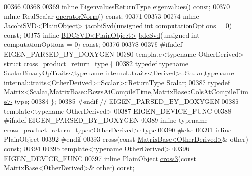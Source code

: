 \begin{DoxyCode}
00366 
00368 
00369     \textcolor{keyword}{inline} EigenvaluesReturnType \hyperlink{group___core___module_a30430fa3d5b4e74d312fd4f502ac984d}{eigenvalues}() \textcolor{keyword}{const};
00370     \textcolor{keyword}{inline} RealScalar \hyperlink{group___core___module_a0ff9bc0b9bea2d0822a2bf3192783102}{operatorNorm}() \textcolor{keyword}{const};
00371 
00373 
00374     \textcolor{keyword}{inline} \hyperlink{group___s_v_d___module_class_eigen_1_1_jacobi_s_v_d}{JacobiSVD<PlainObject>} \hyperlink{group___core___module_a5745dca9c54390633b434e54a1d1eedd}{jacobiSvd}(\textcolor{keywordtype}{unsigned} \textcolor{keywordtype}{int} computationOptions 
      = 0) \textcolor{keyword}{const};
00375     \textcolor{keyword}{inline} \hyperlink{group___s_v_d___module_class_eigen_1_1_b_d_c_s_v_d}{BDCSVD<PlainObject>}    \hyperlink{group___core___module_ae171b74b5d530846ee0836135ffcf837}{bdcSvd}(\textcolor{keywordtype}{unsigned} \textcolor{keywordtype}{int} computationOptions = 0) \textcolor{keyword}{
      const};
00376 
00378 
00379 \textcolor{preprocessor}{    #ifndef EIGEN\_PARSED\_BY\_DOXYGEN}
00380     \textcolor{keyword}{template}<\textcolor{keyword}{typename} OtherDerived> \textcolor{keyword}{struct }cross\_product\_return\_type \{
00382       \textcolor{keyword}{typedef} \textcolor{keyword}{typename} ScalarBinaryOpTraits<typename internal::traits<Derived>::Scalar,\textcolor{keyword}{typename} 
      \hyperlink{struct_eigen_1_1internal_1_1traits}{internal::traits<OtherDerived>::Scalar}>::ReturnType Scalar;
00383       \textcolor{keyword}{typedef} 
      \hyperlink{group___core___module_class_eigen_1_1_matrix}{Matrix<Scalar,MatrixBase::RowsAtCompileTime,MatrixBase::ColsAtCompileTime>}
       type;
00384     \};
00385 \textcolor{preprocessor}{    #endif // EIGEN\_PARSED\_BY\_DOXYGEN}
00386     \textcolor{keyword}{template}<\textcolor{keyword}{typename} OtherDerived>
00387     EIGEN\_DEVICE\_FUNC
00388 \textcolor{preprocessor}{#ifndef EIGEN\_PARSED\_BY\_DOXYGEN}
00389     \textcolor{keyword}{inline} \textcolor{keyword}{typename} cross\_product\_return\_type<OtherDerived>::type
00390 \textcolor{preprocessor}{#else}
00391     \textcolor{keyword}{inline} PlainObject
00392 \textcolor{preprocessor}{#endif}
00393     cross(\textcolor{keyword}{const} \hyperlink{group___core___module_class_eigen_1_1_matrix_base}{MatrixBase<OtherDerived>}& other) \textcolor{keyword}{const};
00394 
00395     \textcolor{keyword}{template}<\textcolor{keyword}{typename} OtherDerived>
00396     EIGEN\_DEVICE\_FUNC
00397     \textcolor{keyword}{inline} PlainObject \hyperlink{group___geometry___module_gaf10988c8393785423ae68a5afdf83226}{cross3}(\textcolor{keyword}{const} \hyperlink{group___core___module_class_eigen_1_1_matrix_base}{MatrixBase<OtherDerived>}& other) \textcolor{keyword}{const};

\end{DoxyCode}

